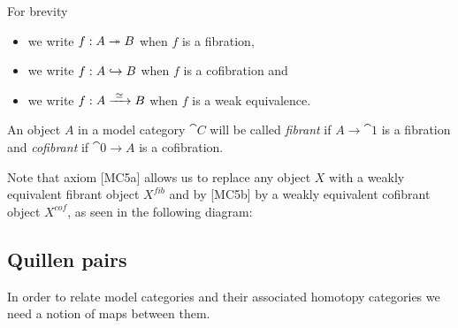 \begin{notation} For brevity
	\begin{itemize}
		\item we write $f: A \twoheadrightarrow B$ when $f$ is a fibration,
		\item we write $f: A \hookrightarrow B$ when $f$ is a cofibration and
		\item we write $f: A \xrightarrow{\,\,{\simeq}\,\,} B$ when $f$ is a weak equivalence.
	\end{itemize}
\end{notation}

\begin{definition}
	An object $A$ in a model category $\cat{C}$ will be called \emph{fibrant} if $A \to \cat{1}$ is a fibration and \emph{cofibrant} if $\cat{0} \to A$ is a cofibration.
\end{definition}

Note that axiom [MC5a] allows us to replace any object $X$ with a weakly equivalent fibrant object $X^{fib}$ and by [MC5b] by a weakly equivalent cofibrant object $X^{cof}$, as seen in the following diagram:

\begin{center}
\quad
{}
\end{center}





\subsection{Quillen pairs}
In order to relate model categories and their associated homotopy categories we need a notion of maps between them.
